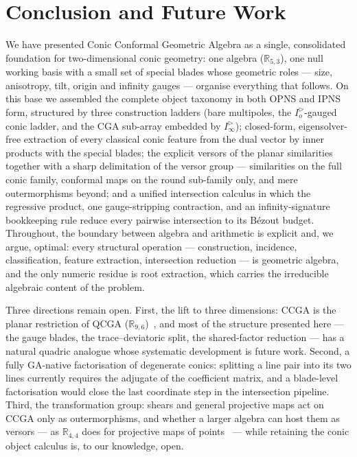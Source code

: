 \documentclass{birkjour}
\theoremstyle{definition}
\theoremstyle{remark}
\newcommand{\Iod}{I_o^{\triangleright}}      %
\newcommand{\Iinfd}{I_\infty^{\triangleright}}%
\begin{document}
\section{Conclusion and Future Work}
\label{sec:conclusion}
We have presented Conic Conformal Geometric Algebra as a single, consolidated
foundation for two-dimensional conic geometry: one algebra
($\mathbb{R}_{5,3}$), one null working basis with a small set of special
blades whose geometric roles --- size, anisotropy, tilt, origin and infinity
gauges --- organise everything that follows. On this base we assembled the
complete object taxonomy in both OPNS and IPNS form, structured by three
construction ladders (bare multipoles, the $\Iod$-gauged conic ladder, and
the CGA sub-array embedded by $\Iinfd$); closed-form, eigensolver-free
extraction of every classical conic feature from the dual vector by inner
products with the special blades; the explicit versors of the planar
similarities together with a sharp delimitation of the versor group ---
similarities on the full conic family, conformal maps on the round sub-family
only, and mere outermorphisms beyond; and a unified intersection calculus in
which the regressive product, one gauge-stripping contraction, and an
infinity-signature bookkeeping rule reduce every pairwise intersection to its
B\'ezout budget. Throughout, the boundary between algebra and arithmetic is
explicit and, we argue, optimal: every structural operation ---
construction, incidence, classification, feature extraction, intersection
reduction --- is geometric algebra, and the only numeric residue is root
extraction, which carries the irreducible algebraic content of the problem.

Three directions remain open. First, the lift to three dimensions: CCGA is
the planar restriction of QCGA
($\mathbb{R}_{9,6}$)~\cite{breuils_three-dimensional_2019}, and most of the
structure presented here --- the gauge blades, the trace--deviatoric split,
the shared-factor reduction --- has a natural quadric analogue whose
systematic development is future work. Second, a fully GA-native
factorisation of degenerate conics: splitting a line pair into its two lines
currently requires the adjugate of the coefficient matrix, and a blade-level
factorisation would close the last coordinate step in the intersection
pipeline. Third, the transformation group: shears and general projective
maps act on CCGA only as outermorphisms, and whether a larger algebra can
host them as versors --- as $\mathbb{R}_{4,4}$ does for projective maps of
points~\cite{goldman_r4_2015} --- while retaining the conic object calculus
is, to our knowledge, open.



\end{document}
